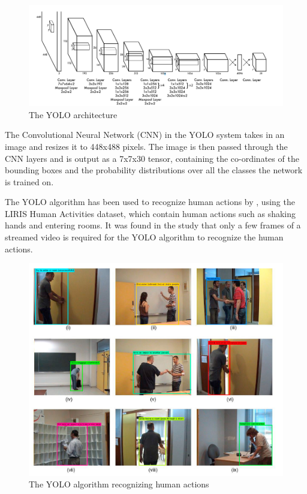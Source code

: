 \documentclass[12pt,a4paper]{report}
\begin{document}
\begin{figure}[h!]
	\begin{center}
		\includegraphics[scale=0.4]{Images/Literature/YOLO_Architecture.png}
		\caption{The YOLO architecture \citep{Redmon2015}}
	\end{center}
\end{figure}

The Convolutional Neural Network (CNN) in the YOLO system takes in an image and resizes it to 448x488 pixels. The image is then passed through the CNN layers and is output as a 7x7x30 tensor, containing the co-ordinates of the bounding boxes and the probability distributions over all the classes the network is trained on. 

The YOLO algorithm has been used to recognize human actions by \cite{Shinde2018}, using the LIRIS Human Activities dataset, which contain human actions such as shaking hands and entering rooms. It was found in the study that only a few frames of a streamed video is required for the YOLO algorithm to recognize the human actions.

\begin{figure}[h!]
	\begin{center}
		\includegraphics[scale=0.4]{Images/Literature/YOLO_Action_Recognition.png}
		\caption{The YOLO algorithm recognizing human actions \citep{Shinde2018}}
	\end{center}
\end{figure}
\end{document}
